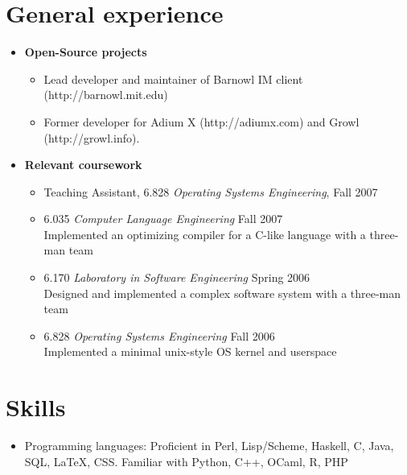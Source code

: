 \documentclass[letterpaper,10pt]{article}
\begin{document}
\vspace*{-0.7cm}
\section*{General experience}
\vspace*{-0.2cm}
\begin{itemize}
  \item \textbf{Open-Source projects} \\
    \vspace*{-0.5cm}
    \begin{itemize}
      \item Lead developer and maintainer of Barnowl IM client
        (http://barnowl.mit.edu)
      \item Former developer for Adium X (http://adiumx.com) and Growl
        (http://growl.info).
    \end{itemize}

  \item \textbf{Relevant coursework}
  \begin{itemize}
      \item Teaching Assistant, 6.828 {\em Operating Systems Engineering}, Fall 2007
      \item 6.035 {\em Computer Language Engineering} Fall 2007 \\
        Implemented an optimizing compiler for a C-like language with a three-man team
      \item 6.170 {\em Laboratory in Software Engineering} Spring 2006 \\
        Designed and implemented a complex software system with a three-man team
      \item 6.828 {\em Operating Systems Engineering} Fall 2006 \\
        Implemented a minimal unix-style OS kernel and userspace
  \end{itemize}
\end{itemize}

\section*{Skills}
\vspace*{-0.2cm}
\begin{itemize}
  \item Programming languages: Proficient in Perl, Lisp/Scheme, Haskell,
    C, Java, SQL, \LaTeX, CSS. Familiar with Python, C++, OCaml, R, PHP

\end{itemize}
\end{document}

